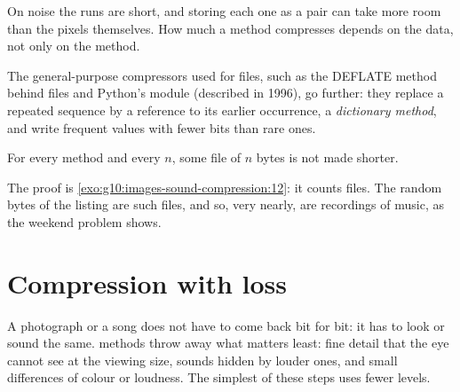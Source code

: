 \label{out:g10:images-sound-compression:rle}

On noise the runs are short, and storing each one as a pair can take more room than the pixels themselves. How much
a method compresses depends on the data, not only on the method.

The general-purpose compressors used for files, such as the DEFLATE method behind  files and Python's
 module (described in 1996), go further: they replace a repeated sequence by a reference to its earlier
occurrence, a \emph{dictionary method}, and write frequent values with fewer bits than rare ones.

\label{lst:g10:images-sound-compression:zlib-sizes}

\label{out:g10:images-sound-compression:zlib-sizes}

\begin{proposition}\label{prop:g10:images-sound-compression:no-universal}
For every   method and every $n$, some file of $n$ bytes is not made shorter.
\end{proposition}

The proof is \cref{exo:g10:images-sound-compression:12}: it counts files. The random bytes of the listing are such
files, and so, very nearly, are recordings of music, as the weekend problem shows.

\section{Compression with loss}\label{sec:g10:images-sound-compression:lossy}

A photograph or a song does not have to come back bit for bit: it has to look or sound the same.  methods throw
away what matters least: fine detail that the eye cannot see at the viewing size, sounds hidden by louder ones, and
small differences of colour or loudness. The simplest of these steps uses fewer levels.

